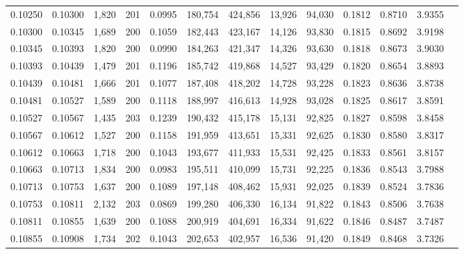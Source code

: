 \begin{tabular}{rrrrrrrrrrrrr}
0.10250 & 0.10300 & 1,820 & 201 &                                     0.0995 & 180,754 & 424,856 &  13,926 &  94,030 & 0.1812 & 0.8710 & 3.9355 \\
0.10300 & 0.10345 & 1,689 & 200 &                                     0.1059 & 182,443 & 423,167 &  14,126 &  93,830 & 0.1815 & 0.8692 & 3.9198 \\
0.10345 & 0.10393 & 1,820 & 200 &                                     0.0990 & 184,263 & 421,347 &  14,326 &  93,630 & 0.1818 & 0.8673 & 3.9030 \\
0.10393 & 0.10439 & 1,479 & 201 &                                     0.1196 & 185,742 & 419,868 &  14,527 &  93,429 & 0.1820 & 0.8654 & 3.8893 \\
0.10439 & 0.10481 & 1,666 & 201 &                                     0.1077 & 187,408 & 418,202 &  14,728 &  93,228 & 0.1823 & 0.8636 & 3.8738 \\
0.10481 & 0.10527 & 1,589 & 200 &                                     0.1118 & 188,997 & 416,613 &  14,928 &  93,028 & 0.1825 & 0.8617 & 3.8591 \\
0.10527 & 0.10567 & 1,435 & 203 &                                     0.1239 & 190,432 & 415,178 &  15,131 &  92,825 & 0.1827 & 0.8598 & 3.8458 \\
0.10567 & 0.10612 & 1,527 & 200 &                                     0.1158 & 191,959 & 413,651 &  15,331 &  92,625 & 0.1830 & 0.8580 & 3.8317 \\
0.10612 & 0.10663 & 1,718 & 200 &                                     0.1043 & 193,677 & 411,933 &  15,531 &  92,425 & 0.1833 & 0.8561 & 3.8157 \\
0.10663 & 0.10713 & 1,834 & 200 &                                     0.0983 & 195,511 & 410,099 &  15,731 &  92,225 & 0.1836 & 0.8543 & 3.7988 \\
0.10713 & 0.10753 & 1,637 & 200 &                                     0.1089 & 197,148 & 408,462 &  15,931 &  92,025 & 0.1839 & 0.8524 & 3.7836 \\
0.10753 & 0.10811 & 2,132 & 203 &                                     0.0869 & 199,280 & 406,330 &  16,134 &  91,822 & 0.1843 & 0.8506 & 3.7638 \\
0.10811 & 0.10855 & 1,639 & 200 &                                     0.1088 & 200,919 & 404,691 &  16,334 &  91,622 & 0.1846 & 0.8487 & 3.7487 \\
0.10855 & 0.10908 & 1,734 & 202 &                                     0.1043 & 202,653 & 402,957 &  16,536 &  91,420 & 0.1849 & 0.8468 & 3.7326 \\

\end{tabular}
